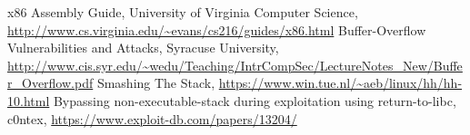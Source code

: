 \documentclass[a4paper,11pt]{article}
\begin{document}
\begin{thebibliography}{---}
x86 Assembly Guide, University of Virginia Computer Science, \url{http://www.cs.virginia.edu/~evans/cs216/guides/x86.html}
 Buffer-Overflow Vulnerabilities and Attacks, Syracuse University, \url{http://www.cis.syr.edu/~wedu/Teaching/IntrCompSec/LectureNotes_New/Buffer_Overflow.pdf}
 Smashing The Stack, \url{https://www.win.tue.nl/~aeb/linux/hh/hh-10.html} 
 Bypassing non-executable-stack during exploitation using return-to-libc, c0ntex, \url{https://www.exploit-db.com/papers/13204/}
\end{thebibliography}
\end{document}
